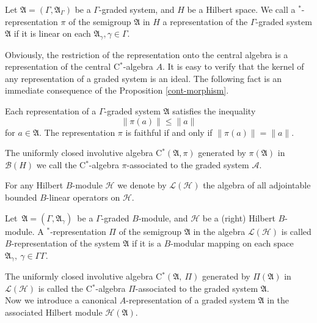 \documentclass[
11pt,%
tightenlines,%
twoside,%
onecolumn,%
nofloats,%
nobibnotes,%
nofootinbib,%
superscriptaddress,%
noshowpacs,%
centertags]%
{revtex4}
\begin{document}
\begin{definition}
Let $\mathfrak A = (\Gamma, \mathfrak A_\Gamma)$  be a $\Gamma$-graded system, and  $H$  be a Hilbert space. We call a $^*$-representation $\pi$ of the semigroup $\mathfrak A$   in  $H$  a  representation of  the $\Gamma$-graded system $\mathfrak A$  if it is linear on each $\mathfrak A_\gamma, \gamma\in\Gamma$.
\end{definition}

\noindent Obviously, the restriction of the representation   onto the central algebra is a representation of the central C$^*$-algebra $A$. It is easy to verify that the kernel of any representation of a graded system is an ideal.
The following fact is an immediate consequence of the Proposition \ref{cont-morphism}.

\begin{proposition}\label{cont-Repr}
Each representation   of a $\Gamma$-graded system $\mathfrak A$  satisfies the inequality
\begin{equation}\label{cont-repr}
\| \pi(a) \| \leq \| a \|
\end{equation}
for $a\in\mathfrak A$. The  representation $\pi$  is faithful if and only if  $\| \pi(a) \| = \| a \|$.
\end{proposition}

\noindent
The uniformly closed involutive algebra C$^*(\mathfrak A, \pi)$ generated by  $\pi(\mathfrak A)$ in $\mathcal B(H)$ we call the             C$^*$-algebra  $\pi$-associated to the graded system $\mathcal A$.

\smallskip\noindent For any Hilbert  $B$-module $\mathcal H$  we denote by  $\mathcal L(\mathcal H)$  the algebra of all adjointable bounded  $B$-linear operators on $\mathcal H$.

\begin{definition}
    Let\  $\mathfrak A = (\Gamma, \mathfrak A_\gamma)$\ be a $\Gamma$-graded $B$-module, and $\mathcal H$  be a (right) Hilbert $B$-module. A $^*$-representation $\Pi$ of the semigroup  $\mathfrak A$  in  the algebra $\mathcal L(\mathcal H)$  is called  $B$-representation of the system $\mathfrak A$ if it is a   $B$-modular mapping on each space $\mathfrak A_\gamma,\ \gamma\in\Gamma Γ$.
\end{definition}

\noindent The uniformly closed involutive algebra  C$^*(\mathfrak A,\ \Pi)$  generated by  $\Pi(\mathfrak A)$  in  $\mathcal L(\mathcal H)$  is called the
C$^*$-algebra  $\Pi$-associated to the graded system $\mathfrak A$.\\
Now we introduce a canonical $A$-representation of a graded system $\mathfrak A$ in the associated Hilbert module  $\mathcal H(\mathfrak A)$.
\end{document}
